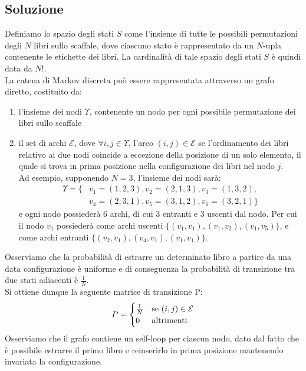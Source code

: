 \documentclass[
	12pt, %
]{fphw}
\begin{document}
\subsection*{Soluzione}
Definiamo lo spazio degli stati $S$ come l'insieme di tutte le possibili permutazioni degli $N$ libri sullo scaffale, dove ciascuno stato è rappresentato da un $N$-upla contenente le etichette dei libri.
La cardinalità di tale spazio degli stati $S$ è quindi data da $N!$.\\
La catena di Markov discreta può essere rappresentata attraverso un grafo diretto, costituito da:
\begin{enumerate}
	\item l'insieme dei nodi $\Upsilon$, contenente un nodo per ogni possibile permutazione dei libri sullo scaffale
	\item il set di archi $\mathcal{E}$, dove $\forall i, j \in \Upsilon$, l'arco $(i,j) \in \mathcal{E}$ se l'ordinamento dei libri relativo ai due nodi coincide a eccezione della posizione di un solo elemento,
	il quale si trova in prima posizione nella configurazione dei libri nel nodo $j$.\\
	Ad esempio, supponendo $N = 3$, l'insieme dei nodi sarà:
	\begin{align*}
		\Upsilon = \{&v_1=(1,2,3), v_2=(2,1,3), v_3=(1,3,2), \\
			&v_4=(2,3,1), v_5=(3,1,2), v_6=(3,2,1)\}
	\end{align*}
	e ogni nodo possiederà $6$ archi, di cui $3$ entranti e $3$ uscenti dal nodo. Per cui il nodo $v_1$ possiederà come archi uscenti $\{(v_1,v_1), (v_1,v_2), (v_1,v_5)\}$,
	e come archi entranti $\{(v_2,v_1), (v_4,v_1), (v_1,v_1)\}$.
	
\end{enumerate}
Osserviamo che la probabilità di estrarre un determinato libro a partire da una data configurazione è uniforme e di conseguenza la probabilità di transizione tra due stati adiacenti è $\textstyle\frac{1}{N}$.\\
Si ottiene dunque la seguente matrice di transizione P:
\begin{equation*}
	P = \begin{cases} 
		\frac{1}{N} & \textnormal{se } (i,j)\in \mathcal{E}\\
		0 & \textnormal{altrimenti}
	\end{cases}
\end{equation*}
Osserviamo che il grafo contiene un self-loop per ciascun nodo, dato dal fatto che è possibile estrarre il primo libro e reinserirlo in prima posizione mantenendo invariata la configurazione.\\
\end{document}
